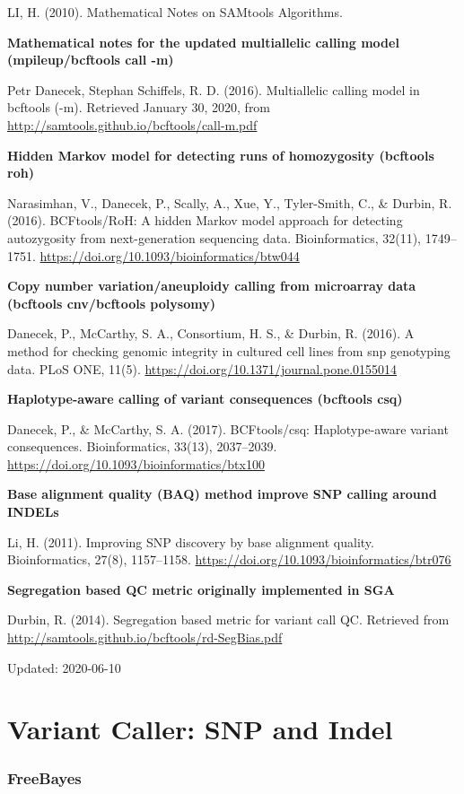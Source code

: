 \documentclass[]{article}
\begin{document}
LI, H. (2010). Mathematical Notes on SAMtools Algorithms.

\textbf{Mathematical notes for the updated multiallelic calling model (mpileup/bcftools call -m)}

Petr Danecek, Stephan Schiffels, R. D. (2016). Multiallelic calling model in bcftools (-m). Retrieved January 30, 2020, from \url{http://samtools.github.io/bcftools/call-m.pdf}

\textbf{Hidden Markov model for detecting runs of homozygosity (bcftools roh)}

Narasimhan, V., Danecek, P., Scally, A., Xue, Y., Tyler-Smith, C., \& Durbin, R. (2016). BCFtools/RoH: A hidden Markov model approach for detecting autozygosity from next-generation sequencing data. Bioinformatics, 32(11), 1749–1751. \url{https://doi.org/10.1093/bioinformatics/btw044}

\textbf{Copy number variation/aneuploidy calling from microarray data (bcftools cnv/bcftools polysomy)}


Danecek, P., McCarthy, S. A., Consortium, H. S., \& Durbin, R. (2016). A method for checking genomic integrity in cultured cell lines from snp genotyping data. PLoS ONE, 11(5). \url{https://doi.org/10.1371/journal.pone.0155014}

\textbf{Haplotype-aware calling of variant consequences (bcftools csq)}

Danecek, P., \& McCarthy, S. A. (2017). BCFtools/csq: Haplotype-aware variant consequences. Bioinformatics, 33(13), 2037–2039. \url{https://doi.org/10.1093/bioinformatics/btx100}

\textbf{Base alignment quality (BAQ) method improve SNP calling around INDELs}


Li, H. (2011). Improving SNP discovery by base alignment quality. Bioinformatics, 27(8), 1157–1158. \url{https://doi.org/10.1093/bioinformatics/btr076}

\textbf{Segregation based QC metric originally implemented in SGA}

Durbin, R. (2014). Segregation based metric for variant call QC. Retrieved from \url{http://samtools.github.io/bcftools/rd-SegBias.pdf}

Updated: 2020-06-10

\part{Variant Caller: SNP and Indel}
\section{FreeBayes}
\end{document}
